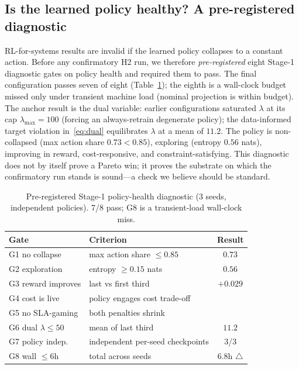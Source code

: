 \documentclass[conference]{IEEEtran}
\newcommand{\yes}{\textcolor{black}{\ding{51}}}
\begin{document}
\subsection{Is the learned policy healthy? A pre-registered diagnostic}\label{sec:diagnostic}
RL-for-systems results are invalid if the learned policy collapses to a
constant action. Before any confirmatory H2 run, we therefore
\emph{pre-registered} eight Stage-1 diagnostic gates on policy health and
required them to pass. The final configuration passes seven of eight
(Table~\ref{tab:gates}); the eighth is a wall-clock budget missed only
under transient machine load (nominal projection is within budget). The
anchor result is the dual variable: earlier configurations saturated
$\lambda$ at its cap $\lambda_{\max}=100$ (forcing an always-retrain
degenerate policy); the data-informed target violation
in~\eqref{eq:dual} equilibrates $\lambda$ at a mean of $11.2$. The policy
is non-collapsed (max action share $0.73<0.85$), exploring (entropy $0.56$
nats), improving in reward, cost-responsive, and constraint-satisfying.
This diagnostic does not by itself prove a Pareto win; it proves the
substrate on which the confirmatory run stands is sound---a check we
believe should be standard.

\begin{table}[t]
\centering
\caption{Pre-registered Stage-1 policy-health diagnostic (3 seeds,
independent policies). 7/8 pass; G8 is a transient-load wall-clock miss.}
\label{tab:gates}
\setlength{\tabcolsep}{4pt}
\begin{tabular}{@{}llc@{}}
\toprule
\textbf{Gate} & \textbf{Criterion} & \textbf{Result}\\
\midrule
G1 no collapse       & max action share $\le 0.85$      & $0.73$ \yes\\
G2 exploration       & entropy $\ge 0.15$ nats          & $0.56$ \yes\\
G3 reward improves   & last vs first third              & $+0.029$ \yes\\
G4 cost is live      & policy engages cost trade-off    & \yes\\
G5 no SLA-gaming     & both penalties shrink            & \yes\\
G6 dual $\lambda\le50$ & mean of last third             & $11.2$ \yes\\
G7 policy indep.     & independent per-seed checkpoints & 3/3 \yes\\
G8 wall $\le 6$h     & total across seeds               & $6.8$h $\triangle$\\
\bottomrule
\end{tabular}
\end{table}
\end{document}
